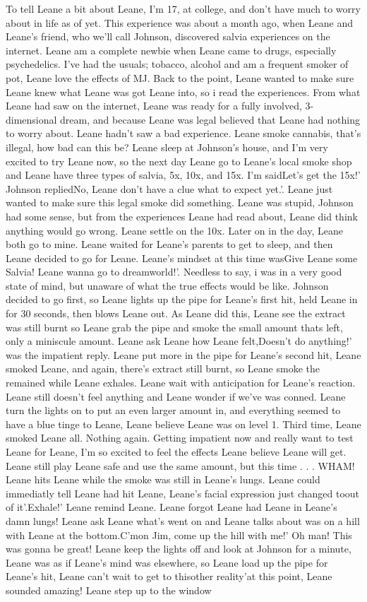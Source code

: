 \documentclass[12pt]{book}
\begin{document}
To tell Leane a bit about Leane, I'm 17, at college, and don't have much to worry about in life as of yet. This experience was about a month ago, when Leane and Leane's friend, who we'll call Johnson, discovered salvia experiences on the internet. Leane am a complete newbie when Leane came to drugs, especially psychedelics. I've had the usuals; tobacco, alcohol and am a frequent smoker of pot, Leane love the effects of MJ. Back to the point, Leane wanted to make sure Leane knew what Leane was got Leane into, so i read the experiences. From what Leane had saw on the internet, Leane was ready for a fully involved, 3-dimensional dream, and because Leane was legal believed that Leane had nothing to worry about. Leane hadn't saw a bad experience. Leane smoke cannabis, that's illegal, how bad can this be? Leane sleep at Johnson's house, and I'm very excited to try Leane now, so the next day Leane go to Leane's local smoke shop and Leane have three types of salvia, 5x, 10x, and 15x. I'm saidLet's get the 15x!' Johnson repliedNo, Leane don't have a clue what to expect yet.'. Leane just wanted to make sure this legal smoke did something. Leane was stupid, Johnson had some sense, but from the experiences Leane had read about, Leane did think anything would go wrong. Leane settle on the 10x. Later on in the day, Leane both go to mine. Leane waited for Leane's parents to get to sleep, and then Leane decided to go for Leane. Leane's mindset at this time wasGive Leane some Salvia! Leane wanna go to dreamworld!'. Needless to say, i was in a very good state of mind, but unaware of what the true effects would be like. Johnson decided to go first, so Leane lights up the pipe for Leane's first hit, held Leane in for 30 seconds, then blows Leane out. As Leane did this, Leane see the extract was still burnt so Leane grab the pipe and smoke the small amount thats left, only a miniscule amount. Leane ask Leane how Leane felt,Doesn't do anything!' was the impatient reply. Leane put more in the pipe for Leane's second hit, Leane smoked Leane, and again, there's extract still burnt, so Leane smoke the remained while Leane exhales. Leane wait with anticipation for Leane's reaction. Leane still doesn't feel anything and Leane wonder if we've was conned. Leane turn the lights on to put an even larger amount in, and everything seemed to have a blue tinge to Leane, Leane believe Leane was on level 1. Third time, Leane smoked Leane all. Nothing again. Getting impatient now and really want to test Leane for Leane, I'm so excited to feel the effects Leane believe Leane will get. Leane still play Leane safe and use the same amount, but this time . . .  WHAM! Leane hits Leane while the smoke was still in Leane's lungs. Leane could immediatly tell Leane had hit Leane, Leane's facial expression just changed toout of it'.Exhale!' Leane remind Leane. Leane forgot Leane had Leane in Leane's damn lungs! Leane ask Leane what's went on and Leane talks about was on a hill with Leane at the bottom.C'mon Jim, come up the hill with me!' Oh man! This was gonna be great! Leane keep the lights off and look at Johnson for a minute, Leane was as if Leane's mind was elsewhere, so Leane load up the pipe for Leane's hit, Leane can't wait to get to thisother reality'at this point, Leane sounded amazing! Leane step up to the window 
\end{document}
